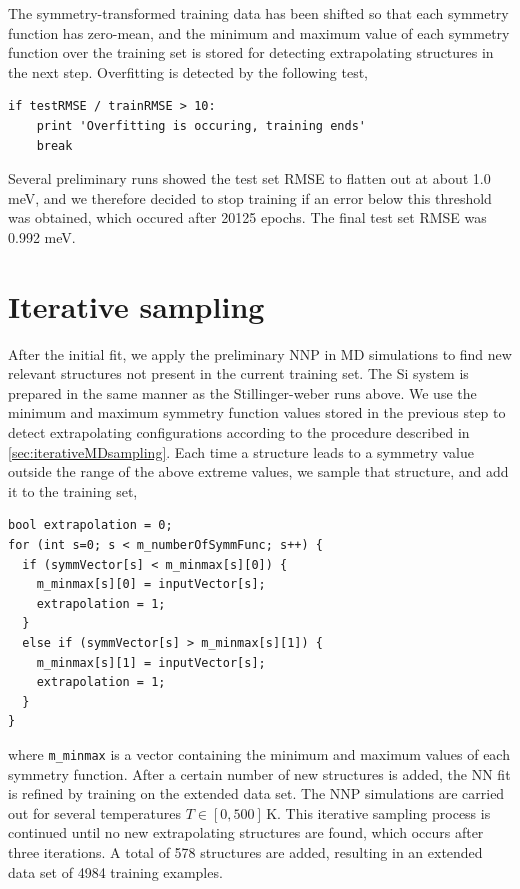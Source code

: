 \documentclass[twoside,english]{uiofysmaster}
\begin{document}
The symmetry-transformed training data has been shifted so that each symmetry function has zero-mean, and 
the minimum and maximum value of each symmetry function over the training set is stored for detecting 
extrapolating structures in the next step. 
Overfitting is detected by the following test,
\begin{verbatim}
if testRMSE / trainRMSE > 10:
    print 'Overfitting is occuring, training ends'
    break
\end{verbatim}
Several preliminary runs showed the test set RMSE to flatten out at about 1.0 meV, and we therefore decided 
to stop training if an error below this threshold was obtained, which occured after 20125 epochs. 
The final test set RMSE was 0.992 meV. 

\section{Iterative sampling} \label{sec:SiIterativeSampling}
After the initial fit, we apply the preliminary NNP in MD simulations to find new relevant structures not present 
in the current training set. The Si system is prepared in the same manner as the Stillinger-weber runs above. 
We use the minimum and maximum symmetry function values stored in the previous step to detect extrapolating
configurations according to the procedure described in \autoref{sec:iterativeMDsampling}. Each time a structure
leads to a symmetry value outside the range of the above extreme values, we sample that structure, and add 
it to the training set, 
\begin{verbatim}
bool extrapolation = 0;
for (int s=0; s < m_numberOfSymmFunc; s++) {
  if (symmVector[s] < m_minmax[s][0]) {
    m_minmax[s][0] = inputVector[s];
    extrapolation = 1;
  }
  else if (symmVector[s] > m_minmax[s][1]) {
    m_minmax[s][1] = inputVector[s];
    extrapolation = 1;
  }
}
\end{verbatim}
where \texttt{m\_minmax} is a vector containing the minimum and maximum values of each symmetry function.
After a certain number of new structures is added, the NN fit is refined by training on the extended data set. 
The NNP simulations are carried out for several temperatures $T \in [0,500] \, \mathrm{K}$. 
This iterative sampling process is continued until no new extrapolating structures are found, which occurs 
after three iterations. A total of 578 structures are added, resulting in an extended data set of 4984 training examples. 
\end{document}
